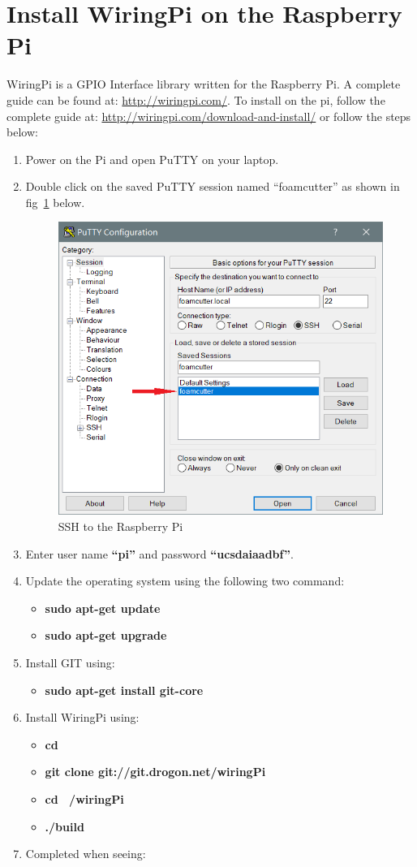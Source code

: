 \documentclass[titlepage,12pt,letter]{report}
\numberwithin{equation}{chapter}
\begin{document}
\section{Install WiringPi on the Raspberry Pi}
WiringPi is a GPIO Interface library written for the Raspberry Pi. A complete guide can be found at: \href{http://wiringpi.com/}{http://wiringpi.com/}. To install on the pi, follow the complete guide at: \href{http://wiringpi.com/download-and-install/}{http://wiringpi.com/download-and-install/} or follow the steps below:

\begin{enumerate}[noitemsep,topsep=0pt]
	\item Power on the Pi and open PuTTY on your laptop.
	\item Double click on the saved PuTTY session named ``foamcutter'' as shown in fig~\ref{fig:wiringpi} below.
	\begin{figure} [H]
	\includegraphics[width = 0.6\linewidth]{./Figures/Laptop_Setup/putty3.png}
	\caption{SSH to the Raspberry Pi}
	\label{fig:wiringpi}
	\end{figure}
	\item Enter user name \textbf{``pi''} and password \textbf{``ucsdaiaadbf''}.
	\item Update the operating system using the following two command:
	\begin{itemize}[noitemsep,topsep=0pt]
		\item \textbf{sudo apt-get update}
		\item \textbf{sudo apt-get upgrade}
	\end{itemize}
	\item Install GIT using:
	\begin{itemize}[noitemsep,topsep=0pt]
		\item \textbf{sudo apt-get install git-core}
	\end{itemize}
	\item Install WiringPi using:
	\begin{itemize}[noitemsep,topsep=0pt]
		\item \textbf{cd}
		\item \textbf{git clone git://git.drogon.net/wiringPi}
		\item \textbf{cd ~/wiringPi}
		\item \textbf{./build}
	\end{itemize}
	\item Completed when seeing: \\
	

\end{enumerate}
\end{document}
